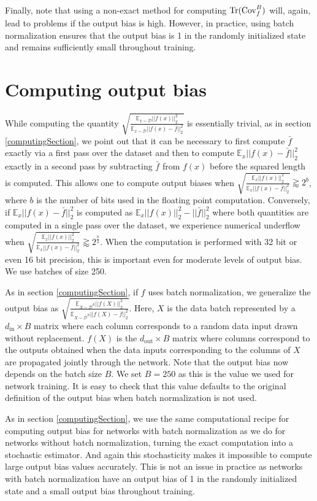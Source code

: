 \documentclass{article} %
\begin{document}
Finally, note that using a non-exact method for computing $\operatorname{Tr}(\mathrm{Cov}_f^B)$ will, again, lead to problems if the output bias is high. However, in practice, using batch normalization ensures that the output bias is 1 in the randomly initialized state and remains sufficiently small throughout training.

\section{Computing output bias} \label{biasComputingSection}

While computing the quantity $\sqrt{\frac{\mathbb{E}_{x\sim\mathcal{D}}||f(x)||_2^2}{\mathbb{E}_{x\sim\mathcal{D}}||f(x)-\bar{f}||_2^2}}$ is essentially trivial, as in section \ref{computingSection}, we point out that it can be necessary to first compute $\bar{f}$ exactly via a first pass over the dataset and then to compute $\mathbb{E}_x||f(x)-\bar{f}||_2^2$ exactly in a second pass by subtracting $\bar{f}$ from $f(x)$ before the squared length is computed. This allows one to compute output biases when $\sqrt{\frac{\mathbb{E}_x||f(x)||_2^2}{\mathbb{E}_x||f(x)-\bar{f}||_2^2}} \gtrapprox 2^b$, where $b$ is the number of bits used in the floating point computation. Conversely, if $\mathbb{E}_x||f(x)-\bar{f}||_2^2$ is computed as $\mathbb{E}_x||f(x)||_2^2-||\bar{f}||_2^2$ where both quantities are computed in a single pass over the dataset, we experience numerical underflow when $\sqrt{\frac{\mathbb{E}_x||f(x)||_2^2}{\mathbb{E}_x||f(x)-\bar{f}||_2^2}} \gtrapprox 2^{\frac{b}{2}}$. When the computation is performed with 32 bit or even 16 bit precision, this is important even for moderate levels of output bias. We use batches of size 250.

As in section \ref{computingSection}, if $f$ uses batch normalization, we generalize the output bias as $\sqrt{\frac{\mathbb{E}_{X \sim \mathcal{D}^B}||f(X)||_2^2}{\mathbb{E}_{X \sim \mathcal{D}^B}||f(X)-\bar{f}||_2^2}}$. Here, $X$ is the data batch represented by a $d_\text{in} \times B$ matrix where each column corresponds to a random data input drawn without replacement. $f(X)$ is the $d_\text{out} \times B$ matrix where columns correspond to the outputs obtained when the data inputs corresponding to the columns of $X$ are propagated jointly through the network. Note that the output bias now depends on the batch size $B$. We set $B=250$ as this is the value we used for network training. It is easy to check that this value defaults to the original definition of the output bias when batch normalization is not used.

As in section \ref{computingSection}, we use the same computational recipe for computing output bias for networks with batch normalization as we do for networks without batch normalization, turning the exact computation into a stochastic estimator. And again this stochasticity makes it impossible to compute large output bias values accurately. This is not an issue in practice as networks with batch normalization have an output bias of 1 in the randomly initialized state and a small output bias throughout training. 
\end{document}
